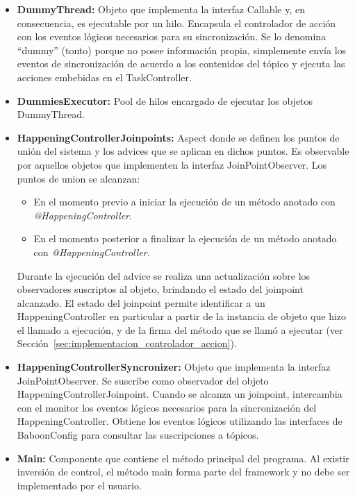 \begin{itemize}
  \item \textbf{DummyThread: } Objeto que implementa la interfaz Callable y, en
  consecuencia, es ejecutable por un hilo. Encapsula el controlador de acción
  con los eventos lógicos necesarios para su sincronización. Se lo denomina
  ``dummy'' (tonto) porque no posee información propia, simplemente envía los
  eventos de sincronización de acuerdo a los contenidos del tópico y ejecuta
  las acciones embebidas en el TaskController.
  
  \item \textbf{DummiesExecutor: } Pool de hilos encargado de ejecutar los
  objetos DummyThread.
  
  \item \textbf{HappeningControllerJoinpoints: } Aspect donde se
  definen los puntos de unión del sistema y los advices que se aplican en
  dichos puntos.
  Es observable por aquellos objetos que implementen la interfaz
  JoinPointObserver.
  Los puntos de union se alcanzan:
  	\begin{itemize}
  	  \item  En el momento previo a iniciar la ejecución de un
  	  método anotado con \emph{@HappeningController}.
  	  \item En el momento posterior a finalizar la ejecución de un
  	  método anotado con \emph{@HappeningController}.
  	\end{itemize}
  Durante la ejecución del advice se realiza una actualización sobre los
  observadores suscriptos al objeto, brindando el estado del joinpoint
  alcanzado. El estado del joinpoint permite identificar a un
  HappeningController en particular a partir de la instancia de objeto que hizo
  el llamado a ejecución, y de la firma del método que se llamó a ejecutar (ver
  Sección~\ref{sec:implementacion_controlador_accion}).
  
  \item \textbf{HappeningControllerSyncronizer: } Objeto que implementa la
  interfaz JoinPointObserver. Se suscribe como observador del objeto
  HappeningControllerJoinpoint. Cuando se alcanza un joinpoint, intercambia con
  el monitor los eventos lógicos necesarios para la sincronización del
  HappeningController. Obtiene los eventos lógicos utilizando las
  interfaces de BaboonConfig para consultar las suscripciones a tópicos.
  
  \item \textbf{Main: } Componente que contiene el método principal del
  programa. Al existir inversión de control, el método main forma parte del
  framework y no debe ser implementado por el usuario.
\end{itemize}

